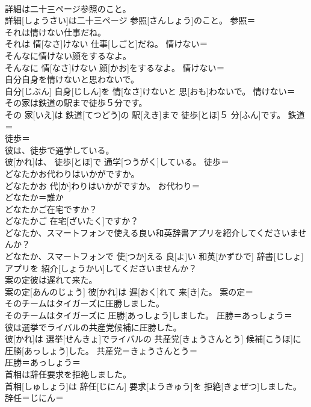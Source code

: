 \documentclass[8pt]{extreport}
\begin{document}
\begin{CJK}{UTF8}{min}
\\	詳細は二十三ページ参照のこと。	
\\	詳細[しょうさい]は二十三ページ 参照[さんしょう]のこと。	参照＝ 
\\	それは情けない仕事だね。	
\\	それは 情[なさ]けない 仕事[しごと]だね。	情けない＝ 
\\	そんなに情けない顔をするなよ。	
\\	そんなに 情[なさ]けない 顔[かお]をするなよ。	情けない＝ 
\\	自分自身を情けないと思わないで。	
\\	自分[じぶん] 自身[じしん]を 情[なさ]けないと 思[おも]わないで。	情けない＝ 
\\	その家は鉄道の駅まで徒歩５分です。	
\\	その 家[いえ]は 鉄道[てつどう]の 駅[えき]まで 徒歩[とほ]５ 分[ふん]です。	鉄道＝ 
\\	徒歩＝ 
\\	彼は、徒歩で通学している。	
\\	彼[かれ]は、 徒歩[とほ]で 通学[つうがく]している。	徒歩＝ 
\\	どなたかお代わりはいかがですか。	
\\	どなたかお 代[か]わりはいかがですか。	お代わり＝ 
\\	どなたか＝誰か
\\	どなたかご在宅ですか？	
\\	どなたかご 在宅[ざいたく]ですか？	
\\	どなたか、スマートフォンで使える良い和英辞書アプリを紹介してくださいませんか？	
\\	どなたか、スマートフォンで 使[つか]える 良[よ]い 和英[かずひで] 辞書[じしょ]アプリを 紹介[しょうかい]してくださいませんか？	
\\	案の定彼は遅れて来た。	
\\	案の定[あんのじょう] 彼[かれ]は 遅[おく]れて 来[き]た。	案の定＝ 
\\	そのチームはタイガーズに圧勝しました。	
\\	そのチームはタイガーズに 圧勝[あっしょう]しました。	圧勝＝あっしょう＝ 
\\	彼は選挙でライバルの共産党候補に圧勝した。	
\\	彼[かれ]は 選挙[せんきょ]でライバルの 共産党[きょうさんとう] 候補[こうほ]に 圧勝[あっしょう]した。	共産党＝きょうさんとう＝ 
\\	圧勝＝あっしょう＝ 
\\	首相は辞任要求を拒絶しました。	
\\	首相[しゅしょう]は 辞任[じにん] 要求[ようきゅう]を 拒絶[きょぜつ]しました。	辞任＝じにん＝ 

\end{CJK}
\end{document}
